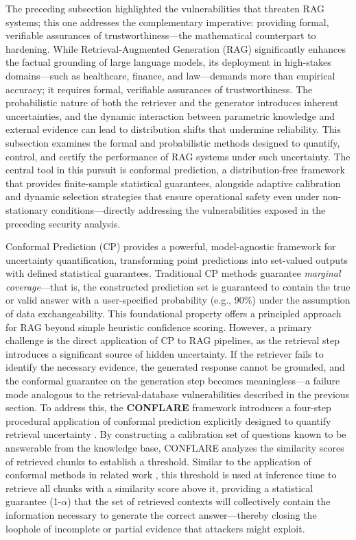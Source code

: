 \documentclass[11pt]{article}
\begin{document}
The preceding subsection highlighted the vulnerabilities that threaten RAG systems; this one addresses the complementary imperative: providing formal, verifiable assurances of trustworthiness---the mathematical counterpart to hardening. While Retrieval-Augmented Generation (RAG) significantly enhances the factual grounding of large language models, its deployment in high-stakes domains---such as healthcare, finance, and law---demands more than empirical accuracy; it requires formal, verifiable assurances of trustworthiness. The probabilistic nature of both the retriever and the generator introduces inherent uncertainties, and the dynamic interaction between parametric knowledge and external evidence can lead to distribution shifts that undermine reliability. This subsection examines the formal and probabilistic methods designed to quantify, control, and certify the performance of RAG systems under such uncertainty. The central tool in this pursuit is conformal prediction, a distribution-free framework that provides finite-sample statistical guarantees, alongside adaptive calibration and dynamic selection strategies that ensure operational safety even under non-stationary conditions---directly addressing the vulnerabilities exposed in the preceding security analysis.

Conformal Prediction (CP) provides a powerful, model-agnostic framework for uncertainty quantification, transforming point predictions into set-valued outputs with defined statistical guarantees. Traditional CP methods guarantee \emph{marginal coverage}---that is, the constructed prediction set is guaranteed to contain the true or valid answer with a user-specified probability (e.g., 90\%) under the assumption of data exchangeability. This foundational property offers a principled approach for RAG beyond simple heuristic confidence scoring. However, a primary challenge is the direct application of CP to RAG pipelines, as the retrieval step introduces a significant source of hidden uncertainty. If the retriever fails to identify the necessary evidence, the generated response cannot be grounded, and the conformal guarantee on the generation step becomes meaningless---a failure mode analogous to the retrieval-database vulnerabilities described in the previous section. To address this, the \textbf{CONFLARE} framework introduces a four-step procedural application of conformal prediction explicitly designed to quantify retrieval uncertainty \cite{ref184}. By constructing a calibration set of questions known to be answerable from the knowledge base, CONFLARE analyzes the similarity scores of retrieved chunks to establish a threshold. Similar to the application of conformal methods in related work \cite{ref289}, this threshold is used at inference time to retrieve all chunks with a similarity score above it, providing a statistical guarantee (1-\(\alpha\)) that the set of retrieved contexts will collectively contain the information necessary to generate the correct answer---thereby closing the loophole of incomplete or partial evidence that attackers might exploit.
\end{document}
